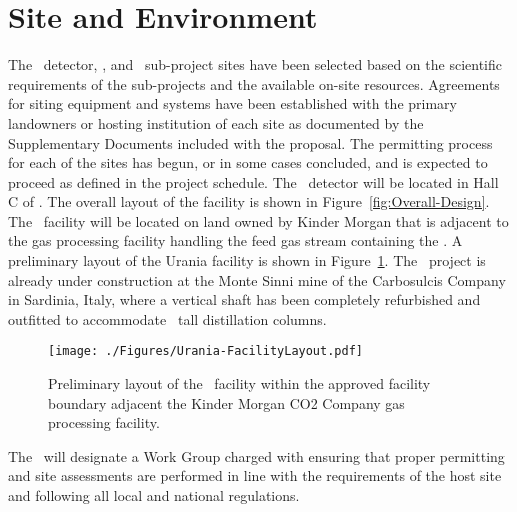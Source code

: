 \section{Site and Environment}

The \DSks\ detector, \Urania, and \Aria\ sub-project sites have been selected based on the scientific requirements of the sub-projects and the available on-site resources.  Agreements for siting equipment and systems have been established with the primary landowners or hosting institution of each site as documented by the Supplementary Documents included with the proposal. The permitting process for each of the sites has begun, or in some cases concluded, and is expected to proceed as defined in the project schedule.  The \DSks\ detector will be located in Hall C of \LNGS. The overall layout of the facility is shown in Figure~\ref{fig:Overall-Design}.  The \Urania\ facility will be located on land owned by Kinder Morgan that is adjacent to the gas processing facility handling the feed gas stream containing the \UAr.  A preliminary layout of the Urania facility is shown in Figure~\ref{fig:UraniaLayout}.  The \Aria\ project is already under construction at the Monte Sinni mine of the Carbosulcis Company in Sardinia, Italy, where a vertical shaft has been completely refurbished and outfitted to accommodate \AriaSeruciHeight\ tall distillation columns.

\begin{figure} [!t]
\texttt{[image: ./Figures/Urania-FacilityLayout.pdf]}
\caption[Preliminary layout of \Urania\ facility]{Preliminary layout of the \Urania\ facility within the approved facility boundary adjacent the Kinder Morgan CO2 Company gas processing facility.}
\label{fig:UraniaLayout} 
\end{figure} 

The \GADMC\ will designate a Work Group charged with ensuring that proper permitting and site assessments are performed in line with the requirements of the host site and following all local and national regulations.